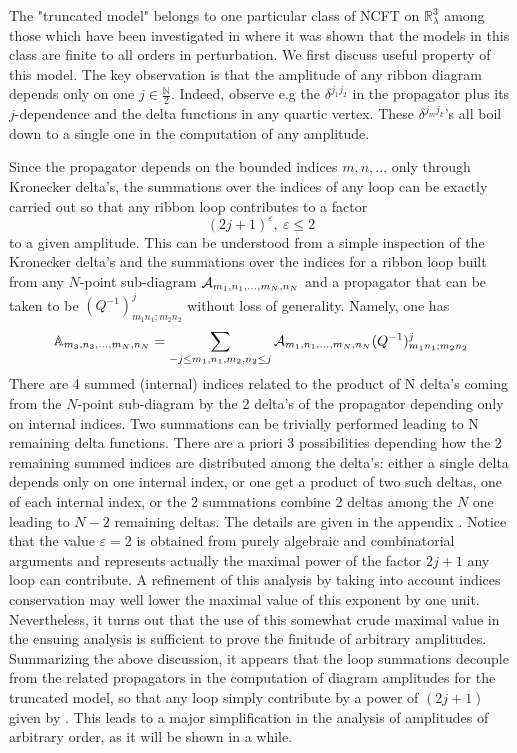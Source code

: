 \documentclass[10pt]{book}
\theoremstyle{break}
\begin{document}
The "truncated model" belongs to one particular class of NCFT on $\mathbb{R}^3_\lambda$ among those which have been investigated in %
where it was shown that the models in this class are finite to all orders in perturbation. We first discuss useful property of this model.
The key observation is that the amplitude of any ribbon diagram depends only on one $j\in\frac{\mathbb{N}}{2}$. Indeed, observe e.g the $\delta^{j_1j_2}$ in the propagator %
plus its $j$-dependence and the delta functions in any quartic vertex. These $\delta^{j_mj_k}$'s all boil down to a single one in the computation of any amplitude.

Since the propagator %
depends on the bounded indices $m,n,...$ only through Kronecker delta's, the summations over the indices of any loop can be exactly carried out so that any ribbon loop contributes to a factor 
\begin{equation*}
(2j+1)^\varepsilon,\ \varepsilon\le2 %
\end{equation*}
to a given amplitude. This can be understood from a simple inspection of the Kronecker delta's and the summations over the indices for a ribbon loop built from any $N$-point sub-diagram ${\cal{A}}_{m_1,n_1,...,m_N,n_N}$ and a propagator %
that can be taken to be $(Q^{-1})^j_{m_1n_1;m_2n_2}$ without loss of generality. Namely, one has
\begin{equation*}
\mathbb{A}_{m_3,n_3,...,m_N,n_N}=\sum_{-j\le m_1,n_1,m_2,n_2\le j}{\cal{A}}_{m_1,n_1,...,m_N,n_N}(Q^{-1})^j_{m_1n_1;m_2n_2}%
\end{equation*}
There are 4 summed (internal) indices related to the product of N delta's 
coming from the $N$-point sub-diagram by the 2 delta's of the propagator depending only on internal indices. Two summations 
can be trivially performed leading to N remaining delta functions. There are a priori 3 possibilities depending how the 2 remaining summed indices are distributed among the delta's: either a single delta depends only on one internal index, or one get a product of two such deltas, one of each internal index, or
the 2 summations combine 2 deltas among the $N$ one leading to $N-2$ remaining deltas. The details are given in the appendix %
. Notice that the value $\varepsilon=2$ is obtained from purely algebraic and combinatorial arguments and represents actually the maximal power of the factor $2j+1$ any loop can contribute. A refinement of this analysis by taking into account indices conservation may well lower the maximal value of this exponent by one unit. Nevertheless, it turns out that the use of this somewhat crude maximal value in the ensuing analysis is sufficient to prove the finitude of arbitrary amplitudes. Summarizing the above discussion, it appears that the loop summations decouple from the related propagators in the computation of diagram amplitudes for the truncated model, so that any loop simply contribute by a power of $(2j+1)$ given by %
. This leads to a major simplification in the analysis of amplitudes of arbitrary order, as it will be shown in a while.\par
\end{document}
